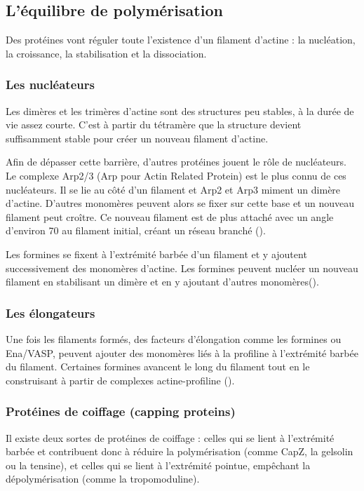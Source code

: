\subsection{L'équilibre de polymérisation}

Des protéines vont réguler toute l'existence d'un filament d'actine : la nucléation, la croissance, la stabilisation et la dissociation. 

\subsubsection{Les nucléateurs}
Les dimères et les trimères d'actine sont des structures peu stables, à la durée de vie assez courte. C'est à partir du tétramère que la structure devient suffisamment stable pour créer un nouveau filament d'actine. 

Afin de dépasser cette barrière, d'autres protéines jouent le rôle de nucléateurs. Le complexe Arp2/3 (Arp pour Actin Related Protein) est le plus connu de ces nucléateurs. Il se lie au côté d'un filament et Arp2 et Arp3 miment un dimère d'actine. D'autres monomères peuvent alors se fixer sur cette base et un nouveau filament peut croître. Ce nouveau filament est de plus attaché avec un angle d'environ 70 \degres au filament initial, créant un réseau branché (\cite{blanchoin_direct_2000}). 

Les formines se fixent à l'extrémité barbée d'un filament et y ajoutent successivement des monomères d'actine. Les formines peuvent nucléer un nouveau filament en stabilisant un dimère et en y ajoutant d'autres monomères(\cite{pring_mechanism_2003}). 

\subsubsection{Les élongateurs}

Une fois les filaments formés, des facteurs d'élongation comme les formines ou Ena/VASP, peuvent ajouter des monomères liés à la profiline à l'extrémité barbée du filament. 
Certaines formines avancent le long du filament tout en le construisant à partir de complexes actine-profiline (\cite{otomo_structural_2005}). 


\subsubsection{Protéines de coiffage (capping proteins)}

Il existe deux sortes de protéines de coiffage : celles qui se lient à l'extrémité barbée et contribuent donc à réduire la polymérisation (comme CapZ, la gelsolin ou la tensine), et celles qui se lient à l'extrémité pointue, empêchant la dépolymérisation (comme la tropomoduline). 


